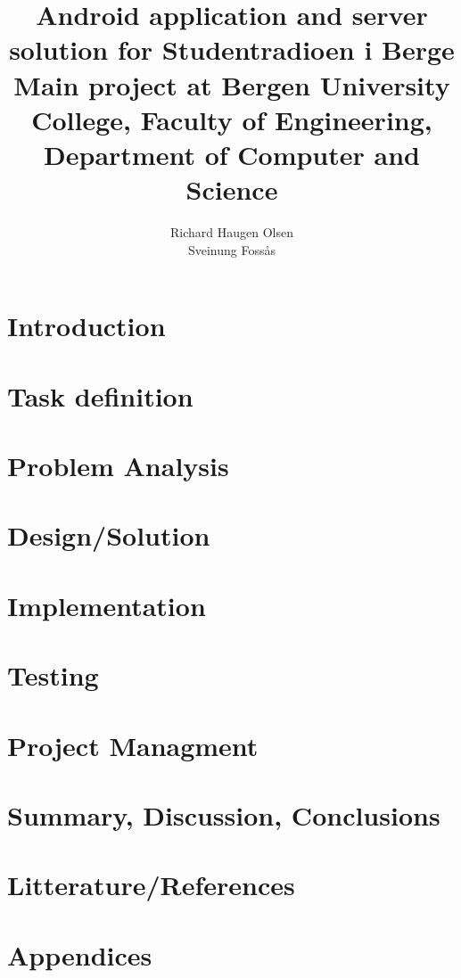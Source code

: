 \documentclass[a4paper,norsk,11pt]{article} %
\title{Android application and server solution for Studentradioen i Berge\\Main project at Bergen University College, Faculty of Engineering, Department of Computer and Science}
\author{Richard Haugen Olsen\\Sveinung Fossås}
\begin{document}
\maketitle




\newpage

\tableofcontents

\newpage


\section{Introduction}



\section{Task definition}


\section{Problem Analysis}

\section{Design/Solution}

\section{Implementation}

\section{Testing}

\section{Project Managment}

\section{Summary, Discussion, Conclusions}

\section{Litterature/References}




\section{Appendices}
\end{document}
